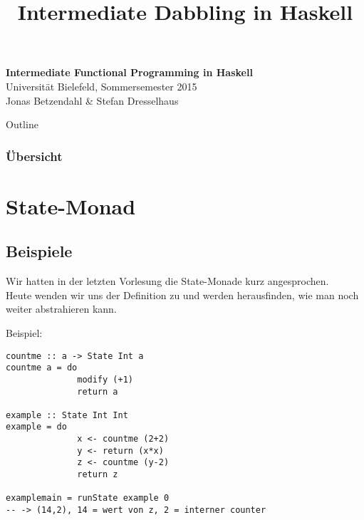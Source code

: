 \documentclass{beamer}
\title{Intermediate Dabbling in Haskell}
\begin{document}
  

  \begin{frame}
  \begin{center}
    \Huge\textbf{Intermediate Functional Programming in Haskell}\\ \bigskip
    \LARGE Universität Bielefeld, Sommersemester 2015\\ \bigskip
    \large Jonas Betzendahl \& Stefan Dresselhaus
    \end{center}
  \end{frame}

\begin{frame}[allowframebreaks]{Outline}
\frametitle{Übersicht}
\tableofcontents[hideallsubsections]
\end{frame}

\section{State-Monad}

\subsection{Beispiele}
\begin{frame}[fragile]
Wir hatten in der letzten Vorlesung die State-Monade kurz angesprochen.\\
Heute wenden wir uns der Definition zu und werden herausfinden, wie man noch weiter abstrahieren kann.\\
\end{frame}

\begin{frame}[fragile]
Beispiel:
\begin{verbatim}
countme :: a -> State Int a
countme a = do
              modify (+1)
              return a

example :: State Int Int
example = do
              x <- countme (2+2)
              y <- return (x*x)
              z <- countme (y-2)
              return z

examplemain = runState example 0
-- -> (14,2), 14 = wert von z, 2 = interner counter
\end{verbatim}
\end{frame}
\end{document}
